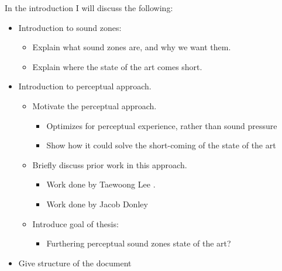 In the introduction I will discuss the following:
\begin{itemize}
    \item Introduction to sound zones:
        \begin{itemize}
            \item Explain what sound zones are, and why we want them.
            \item Explain where the state of the art comes short.
       \end{itemize}
    \item Introduction to perceptual approach.
        \begin{itemize}
            \item Motivate the perceptual approach.
                \begin{itemize}
                    \item Optimizes for perceptual experience, rather than sound pressure
                    \item Show how it could solve the short-coming of the state of the art
                \end{itemize}
            \item Briefly discuss prior work in this approach.
                \begin{itemize}
                    \item Work done by Taewoong Lee 
                        \cite{lee2020signal}\cite{lee2019towards}.
                    \item Work done by Jacob Donley
                        \cite{donley2015multizone}\cite{donley2018multizone}
                \end{itemize}
            \item Introduce goal of thesis:
                \begin{itemize}
                    \item Furthering perceptual sound zones state of the art?
                \end{itemize}
        \end{itemize}
    \item Give structure of the document
\end{itemize}
